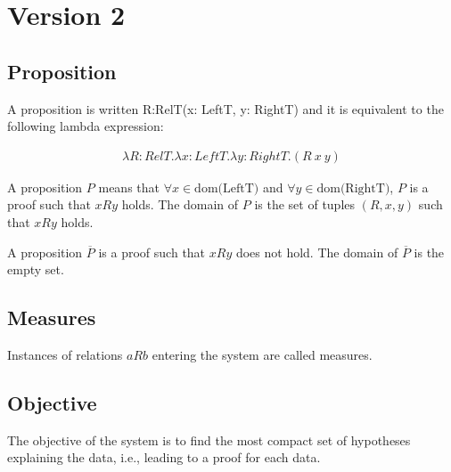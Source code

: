 \section{Version 2}

\subsection{Proposition}

A proposition is written R:RelT(x: LeftT, y: RightT) and it is equivalent to the following lambda expression:

\begin{equation}
\begin{split}
\lambda R:RelT.\lambda x:LeftT.\lambda y:RightT.(R\ x\ y)
\end{split}
\end{equation}

A proposition $P$ means that $\forall x \in \text{dom(LeftT)}$ and $\forall y \in \text{dom(RightT)}$, $P$ is a proof such that $x R y$ holds.
The domain of $P$ is the set of tuples $(R, x, y)$ such that $x R y$ holds.

A proposition $\overline{P}$ is a proof such that $x R y$ does not hold.
The domain of $\overline{P}$ is the empty set.

\subsection{Measures}

Instances of relations $aRb$ entering the system are called measures.

\subsection{Objective}

The objective of the system is to find the most compact set of hypotheses explaining the data, i.e., leading to a proof for each data.
